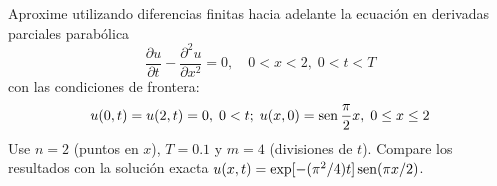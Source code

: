 \documentclass[11pt]{article}
\begin{document}
\begin{question} %
Aproxime utilizando diferencias finitas hacia adelante la ecuación en derivadas parciales parabólica
\[ \frac{\partial u}{\partial t} - \frac{\partial^2 u}{\partial x^2} = 0, \quad 0 < x < 2, \; 0 < t < T \]
con las condiciones de frontera:
\begin{equation*}
    u(0, t) = u(2, t) = 0,\;0 < t; \; u(x, 0) = \operatorname{sen} \frac{\pi}{2} x, \; 0 \leq x \leq 2 
\end{equation*}
Use $n = 2$ (puntos en $x$), $T = 0.1$ y $m = 4$ (divisiones de $t$). Compare los resultados con la solución exacta $u(x, t) = \exp[-(\pi^2/4) t] \operatorname{sen}(\pi x/ 2)$.
\end{question}
\end{document}

